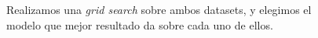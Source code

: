 \begin{figure}[H]
\centering
    \caption{Realizamos una \textit{grid search} sobre ambos datasets, y elegimos el modelo que mejor resultado da sobre cada uno de ellos.} 
\end{figure}



















